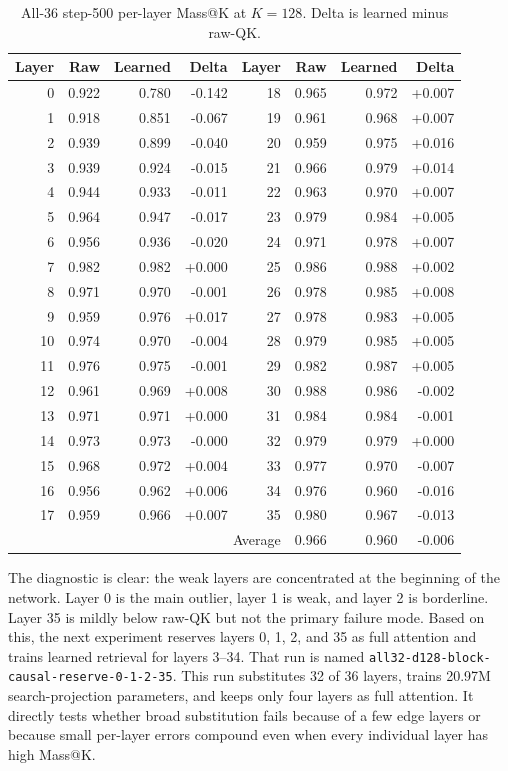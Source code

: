 \documentclass[10pt]{article}
\begin{document}
\begin{table}[h]
\centering
\caption{All-36 step-500 per-layer Mass@K at $K=128$. Delta is learned minus raw-QK.}
\begin{tabular}{rrrrrrrr}
\toprule
Layer & Raw & Learned & Delta & Layer & Raw & Learned & Delta\\
\midrule
0 & 0.922 & 0.780 & -0.142 & 18 & 0.965 & 0.972 & +0.007\\
1 & 0.918 & 0.851 & -0.067 & 19 & 0.961 & 0.968 & +0.007\\
2 & 0.939 & 0.899 & -0.040 & 20 & 0.959 & 0.975 & +0.016\\
3 & 0.939 & 0.924 & -0.015 & 21 & 0.966 & 0.979 & +0.014\\
4 & 0.944 & 0.933 & -0.011 & 22 & 0.963 & 0.970 & +0.007\\
5 & 0.964 & 0.947 & -0.017 & 23 & 0.979 & 0.984 & +0.005\\
6 & 0.956 & 0.936 & -0.020 & 24 & 0.971 & 0.978 & +0.007\\
7 & 0.982 & 0.982 & +0.000 & 25 & 0.986 & 0.988 & +0.002\\
8 & 0.971 & 0.970 & -0.001 & 26 & 0.978 & 0.985 & +0.008\\
9 & 0.959 & 0.976 & +0.017 & 27 & 0.978 & 0.983 & +0.005\\
10 & 0.974 & 0.970 & -0.004 & 28 & 0.979 & 0.985 & +0.005\\
11 & 0.976 & 0.975 & -0.001 & 29 & 0.982 & 0.987 & +0.005\\
12 & 0.961 & 0.969 & +0.008 & 30 & 0.988 & 0.986 & -0.002\\
13 & 0.971 & 0.971 & +0.000 & 31 & 0.984 & 0.984 & -0.001\\
14 & 0.973 & 0.973 & -0.000 & 32 & 0.979 & 0.979 & +0.000\\
15 & 0.968 & 0.972 & +0.004 & 33 & 0.977 & 0.970 & -0.007\\
16 & 0.956 & 0.962 & +0.006 & 34 & 0.976 & 0.960 & -0.016\\
17 & 0.959 & 0.966 & +0.007 & 35 & 0.980 & 0.967 & -0.013\\
\midrule
\multicolumn{5}{r}{Average} & 0.966 & 0.960 & -0.006\\
\bottomrule
\end{tabular}
\end{table}

The diagnostic is clear: the weak layers are concentrated at the beginning of
the network. Layer 0 is the main outlier, layer 1 is weak, and layer 2 is
borderline. Layer 35 is mildly below raw-QK but not the primary failure mode.
Based on this, the next experiment reserves layers 0, 1, 2, and 35 as full
attention and trains learned retrieval for layers 3--34. That run is named
\texttt{all32-d128-block-causal-reserve-0-1-2-35}. This run substitutes 32 of
36 layers, trains 20.97M search-projection parameters, and keeps only four
layers as full attention. It directly tests whether broad substitution fails
because of a few edge layers or because small per-layer errors compound even
when every individual layer has high Mass@K.
\end{document}
